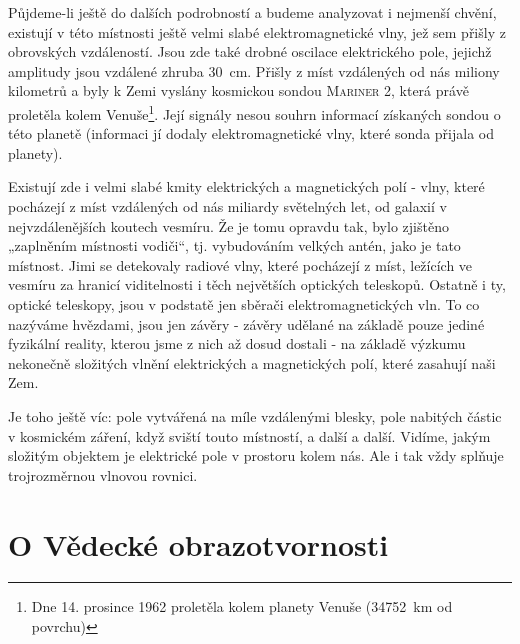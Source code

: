     Půjdeme-li ještě do dalších podrobností a budeme analyzovat i nejmenší chvění, existují v této
    místnosti ještě velmi slabé elektromagnetické vlny, jež sem přišly z obrovských vzdáleností.
    Jsou zde také drobné oscilace elektrického pole, jejichž amplitudy jsou vzdálené zhruba
    \SI{30}{\cm}. Přišly z míst vzdálených od nás miliony kilometrů a byly k Zemi vyslány kosmickou
    sondou \textsc{Mariner 2}, která právě proletěla kolem Venuše\footnote{Dne 14. prosince 1962
    proletěla kolem planety Venuše (\SI{34752}{\km} od povrchu)}. Její signály nesou souhrn
    informací získaných sondou o této planetě (informaci jí dodaly elektromagnetické vlny, které
    sonda přijala od planety).
    
    Existují zde i velmi slabé kmity elektrických a magnetických polí - vlny, které pocházejí z míst
    vzdálených od nás miliardy světelných let, od galaxií v nejvzdálenějších koutech vesmíru. Že je
    tomu opravdu tak, bylo zjištěno „zaplněním místnosti vodiči“, tj. vybudováním velkých antén,
    jako je tato místnost. Jimi se detekovaly radiové vlny, které pocházejí z míst, ležících ve
    vesmíru za hranicí viditelnosti i těch největších optických teleskopů. Ostatně i ty, optické
    teleskopy, jsou v podstatě jen sběrači elektromagnetických vln. To co nazýváme hvězdami, jsou
    jen závěry - závěry udělané na základě pouze jediné fyzikální reality, kterou jsme z nich až
    dosud dostali - na základě výzkumu nekonečně složitých vlnění elektrických a magnetických polí,
    které zasahují naši Zem.
    
    Je toho ještě víc: pole vytvářená na míle vzdálenými blesky, pole nabitých částic v kosmickém
    záření, když sviští touto místností, a další a další. Vidíme, jakým složitým objektem je
    elektrické pole v prostoru kolem nás. Ale i tak vždy splňuje trojrozměrnou vlnovou rovnici.

  \section{O Vědecké obrazotvornosti}\label{fyz:IIchapXXsecIII} 
  
